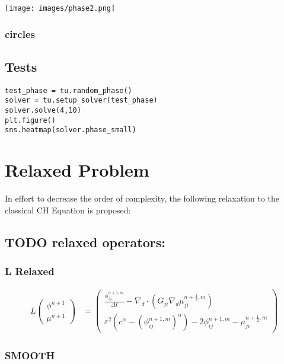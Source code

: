 \documentclass[11pt]{article}
\begin{document}
\begin{center}
\texttt{[image: images/phase2.png]}
\end{center}
\subsubsection{circles}
\label{sec:org6ca2ed6}
\subsection{Tests}
\label{sec:org6df4921}
\begin{verbatim}
test_phase = tu.random_phase()
solver = tu.setup_solver(test_phase)
solver.solve(4,10)
plt.figure()
sns.heatmap(solver.phase_small)
\end{verbatim}
\section{Relaxed Problem}
\label{sec:orgbcef631}
In effort to decrease the order of complexity, the following relaxation to the classical CH Equation is proposed:
\subsection{{\bfseries\sffamily TODO} relaxed operators:}
\label{sec:org947eb8c}
\subsubsection{L Relaxed}
\label{sec:orga587271}
\begin{align*}
L
\begin{pmatrix}
\phi ^{n+1} \\
\mu^{n+1}
\end{pmatrix}
&=
\begin{pmatrix}
\frac{\phi^{n+1,m}_{ij}}{\Delta t} - \nabla _d \cdot (G_{ji} \nabla _d \mu^{n + \frac{1}{2},m}_{ji}) \\
\varepsilon ^2 (c^\alpha - (\phi^{n+1,m}_{ij})^\alpha) - 2\phi ^{n+1,m}_{ij} -\mu^{n + \frac{1}{2},m}_{ji}
\end{pmatrix}
\end{align*}
\subsubsection{SMOOTH}
\label{sec:orga034f90}
\end{document}
